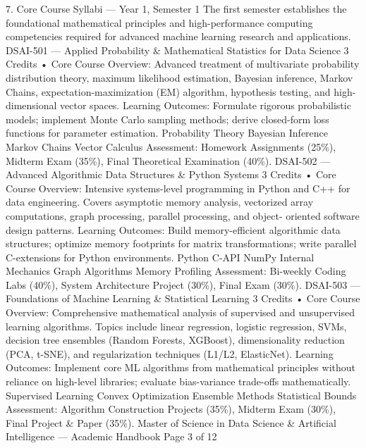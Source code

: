 7. Core Course Syllabi — Year 1, Semester 1
The first semester establishes the foundational mathematical principles and high-performance computing
competencies required for advanced machine learning research and applications.
DSAI-501 — Applied Probability \& Mathematical Statistics for Data Science
3 Credits • Core
Course Overview: Advanced treatment of multivariate probability distribution theory, maximum likelihood
estimation, Bayesian inference, Markov Chains, expectation-maximization (EM) algorithm, hypothesis testing,
and high-dimensional vector spaces.
Learning Outcomes: Formulate rigorous probabilistic models; implement Monte Carlo sampling methods; derive
closed-form loss functions for parameter estimation.
Probability Theory Bayesian Inference Markov Chains Vector Calculus
Assessment: Homework Assignments (25\%), Midterm Exam (35\%), Final Theoretical Examination (40\%).
DSAI-502 — Advanced Algorithmic Data Structures \& Python Systems
3 Credits • Core
Course Overview: Intensive systems-level programming in Python and C++ for data engineering. Covers
asymptotic memory analysis, vectorized array computations, graph processing, parallel processing, and object-
oriented software design patterns.
Learning Outcomes: Build memory-efficient algorithmic data structures; optimize memory footprints for matrix
transformations; write parallel C-extensions for Python environments.
Python C-API NumPy Internal Mechanics Graph Algorithms Memory Profiling
Assessment: Bi-weekly Coding Labs (40\%), System Architecture Project (30\%), Final Exam (30\%).
DSAI-503 — Foundations of Machine Learning \& Statistical Learning
3 Credits • Core
Course Overview: Comprehensive mathematical analysis of supervised and unsupervised learning algorithms.
Topics include linear regression, logistic regression, SVMs, decision tree ensembles (Random Forests, XGBoost),
dimensionality reduction (PCA, t-SNE), and regularization techniques (L1/L2, ElasticNet).
Learning Outcomes: Implement core ML algorithms from mathematical principles without reliance on high-level
libraries; evaluate bias-variance trade-offs mathematically.
Supervised Learning Convex Optimization Ensemble Methods Statistical Bounds
Assessment: Algorithm Construction Projects (35\%), Midterm Exam (30\%), Final Project \& Paper (35\%).
Master of Science in Data Science \& Artificial Intelligence — Academic Handbook
Page 3 of 12

